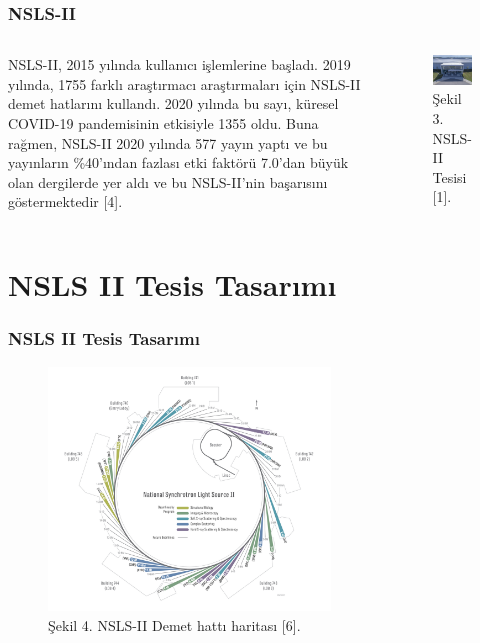 \documentclass[aspectratio=169,10pt]{beamer}
\begin{document}
	
	\begin{frame}[allowframebreaks]
\frametitle{NSLS-II}

\begin{columns}

NSLS-II, 2015 yılında kullanıcı işlemlerine başladı. 2019 yılında, 1755 farklı araştırmacı araştırmaları için NSLS-II demet hatlarını kullandı. 2020 yılında bu sayı, küresel COVID-19 pandemisinin etkisiyle 1355 oldu. Buna rağmen, NSLS-II 2020 yılında 577 yayın yaptı ve bu yayınların \%40'ından fazlası etki faktörü 7.0'dan büyük olan dergilerde yer aldı ve bu NSLS-II'nin başarısını göstermektedir [4].
 
\centering
 \begin{figure}
\includegraphics[width=7cm]{27597220709_1e50948a52_k.jpg}
\caption*{
\centering
Şekil 3. NSLS-II Tesisi [1].}
	\end{figure}
	\end{columns}

\end{frame}

\section{NSLS II Tesis Tasarımı}
	\begin{frame}[allowframebreaks]
	
	
	
\frametitle{NSLS II Tesis Tasarımı}


	\begin{figure}[h]
 \centering
\includegraphics[width=7.5cm]{nsls2-beamlinesclock-jpg.jpg}
\caption*{Şekil 4. NSLS-II Demet hattı haritası [6].}
	\end{figure}
	

\end{frame}
\end{document}
